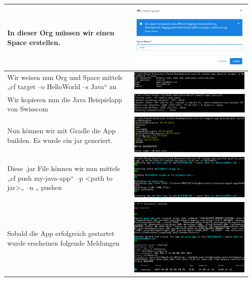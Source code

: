 \begin{longtable}{| p{5cm} | p{11cm} |}
In dieser Org müssen wir einen Space erstellen. 
&\includegraphics[width=0.65\columnwidth, valign=T]{images/image8.png} \\ \hline
Wir weisen nun Org und Space mittels „cf target –o HelloWorld –s Java“ zu &\includegraphics[width=0.65\columnwidth, valign=T]{images/image9.png} \\ \hline
Wir kopieren nun die Java Beispielapp von Swisscom 
&\includegraphics[width=0.65\columnwidth, valign=T]{images/image10.png} \\ \hline
Nun können wir mit Gradle die App builden. Es wurde ein jar generiert. &\includegraphics[width=0.65\columnwidth, valign=T]{images/image11.png} \\ \hline
Diese .jar File können wir nun mittels „cf push my-java-app“ –p <path to jar>„ –n „ pushen &\includegraphics[width=0.65\columnwidth, valign=T]{images/image12.png} \\ \hline
Sobald die App erfolgreich gestartet wurde erscheinen folgende Meldungen &\includegraphics[width=0.65\columnwidth, valign=T]{images/image13.png} \\ \hline 

\end{longtable}
